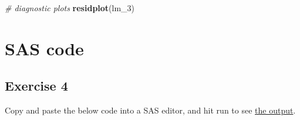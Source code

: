 \documentclass[]{book}
\newenvironment{Shaded}{\begin{snugshade}}{\end{snugshade}}
\newcommand{\CommentTok}[1]{\textcolor[rgb]{0.56,0.35,0.01}{\textit{#1}}}
\newcommand{\DecValTok}[1]{\textcolor[rgb]{0.00,0.00,0.81}{#1}}
\newcommand{\KeywordTok}[1]{\textcolor[rgb]{0.13,0.29,0.53}{\textbf{#1}}}
\newcommand{\NormalTok}[1]{#1}
\begin{document}
\begin{Shaded}
\begin{Highlighting}[]
\CommentTok{# diagnostic plots  }
\KeywordTok{residplot}\NormalTok{(lm_}\DecValTok{3}\NormalTok{)}
\end{Highlighting}
\end{Shaded}

\hypertarget{appendix-appendix}{%
\appendix}


\hypertarget{sascode}{%
\chapter{SAS code}\label{sascode}}

\hypertarget{exercise-4}{%
\section{Exercise 4}\label{exercise-4}}

Copy and paste the below code into a SAS editor, and hit run to see \href{https://github.com/luckymehra/epidem-exercises/blob/master/sas_output/ex4.pdf}{the output}.
\end{document}
